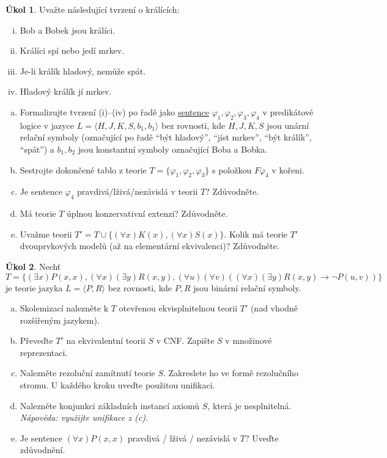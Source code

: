 \documentclass{amsart}
\theoremstyle{definition}
\newtheorem{task}{Úkol}
\begin{document}
\medskip
\begin{task}
Uvažte následující tvrzení o králících:
\begin{enumerate}[(i)]
    \item Bob a Bobek jsou králíci.
    \item Králíci spí nebo jedí mrkev.
    \item Je-li králík hladový, nemůže spát.
    \item Hladový králík jí mrkev.
\end{enumerate}

\begin{enumerate}[(a)]
\item Formalizujte tvrzení (i)--(iv) po řadě jako \underline{sentence} $\varphi_1,\varphi_2,\varphi_3,\varphi_4$ v predikátové logice v jazyce $L=\langle H, J, K, S, b_1, b_1 \rangle$ bez rovnosti, kde $H,J,K,S$ jsou unární relační symboly (označující po řadě ``být hladový'', ``jíst mrkev'', ``být králík'', ``spát'') a $b_1,b_2$ jsou konstantní symboly označující Boba a Bobka.
\item Sestrojte dokončené tablo z teorie $T=\{\varphi_1,\varphi_2,\varphi_3\}$ s položkou $F\varphi_4$ v kořeni. 
\item Je sentence $\varphi_4$ pravdivá/lživá/nezávislá v teorii $T$? Zdůvodněte. 
\item Má teorie $T$ úplnou konzervativní extenzi? Zdůvodněte. 
\item Uvažme teorii $T'=T\cup \{(\forall x)K(x),(\forall x)S(x)\}$. Kolik má teorie $T'$ dvouprvkových modelů (až na elementární ekvivalenci)? Zdůvodněte. 
\end{enumerate}
\end{task}


\medskip
\begin{task}
Nechť $T=\{(\exists x)P(x,x), (\forall x)(\exists y)R(x,y),  (\forall u)(\forall v)((\forall x)(\exists y)R(x,y) \to \neg P(u,v))\}$ je teorie jazyka $L=\langle P,R\rangle$ bez rovnosti, kde $P,R$ jsou binární relační symboly.
\begin{enumerate}[(a)]
\item Skolemizací nalezněte k $T$ otevřenou ekvisplnitelnou teorii $T'$ (nad vhodně rozšířeným jazykem). 
\item Převeďte $T'$ na ekvivalentní teorii $S$ v CNF. Zapište $S$ v množinové reprezentaci.
\item Nalezněte rezoluční zamítnutí teorie $S$. Zakreslete ho ve formě rezolučního stromu. U každého kroku uveďte použitou unifikaci.
\item Nalezněte konjunkci základních instancí axiomů $S$, která je nesplnitelná. {\it Nápověda: využijte unifikace z (c).} 
\item Je sentence $(\forall x)P(x,x)$ pravdivá / lživá / nezávislá v $T$? Uveďte zdůvodnění. 
\end{enumerate}
\end{task}
\end{document}
